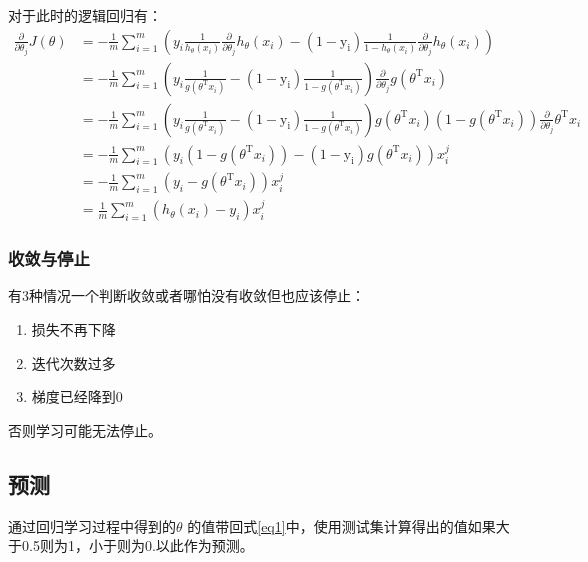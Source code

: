 \documentclass[UTF8,a4paper,AutoFakeBold,AutoFakeSlant]{article}
\begin{document}
对于此时的逻辑回归有：
\begin{equation*}
  \begin{aligned}
    \frac{\partial }{\partial {\theta_j}} J(\theta) & = -\frac{1}{m} \sum_{i = 1}^{m}\left(y_{i} \frac{1}{h_{\theta}\left(x_{i}\right)} \frac{\partial }{\partial {\theta_j}} h_{\theta}\left(x_{i}\right)-\left(1-\mathrm{y}_{\mathrm{i}}\right) \frac{1}{1-h_{\theta}\left(x_{i}\right)} \frac{\partial }{\partial {\theta_j}} h_{\theta}\left(x_{i}\right)\right) \\ 
    & = -\frac{1}{m} \sum_{i  = 1}^{m}\left(y_{i} \frac{1}{g\left(\theta^{\mathrm{T}} x_{i}\right)}-\left(1-\mathrm{y}_{\mathrm{i}}\right) \frac{1}{1-g\left(\theta^{\mathrm{T}} x_{i}\right)}\right) \frac{\partial }{\partial {\theta_j}} g\left(\theta^{\mathrm{T}} x_{i}\right)\\
    &=-\frac{1}{m} \sum_{i=1}^{m}\left(y_{i} \frac{1}{g\left(\theta^{\mathrm{T}} x_{i}\right)}-\left(1-\mathrm{y}_{\mathrm{i}}\right) \frac{1}{1-g\left(\theta^{\mathrm{T}} x_{i}\right)}\right) g\left(\theta^{\mathrm{T}} x_{i}\right)\left(1-g\left(\theta^{\mathrm{T}} x_{i}\right)\right) \frac{\partial }{\partial {\theta_j}} \theta^{\mathrm{T}} x_{i} \\
    &=-\frac{1}{m} \sum_{i=1}^{m}\left(y_{i}\left(1-g\left(\theta^{\mathrm{T}} x_{i}\right)\right)-\left(1-\mathrm{y}_{\mathrm{i}}\right) g\left(\theta^{\mathrm{T}} x_{i}\right)\right) x_{i}^{j} \\
    &=-\frac{1}{m} \sum_{i=1}^{m}\left(y_{i}-g\left(\theta^{\mathrm{T}} x_{i}\right)\right) x_{i}^{j} \\
    &=\frac{1}{m} \sum_{i=1}^{m}\left(h_{\theta}\left(x_{i}\right)-y_{i}\right) x_{i}^{j}
    \end{aligned}
\end{equation*}

\subsubsection{收敛与停止}
有3种情况一个判断收敛或者哪怕没有收敛但也应该停止：
\begin{enumerate}
  \item 损失不再下降
  \item 迭代次数过多
  \item 梯度已经降到0
\end{enumerate}
否则学习可能无法停止。


\subsection{预测}
通过回归学习过程中得到的$\theta$ 的值带回式\ref{eq1}中，使用测试集计算得出的值如果大于0.5则为1，小于则为0.以此作为预测。
\end{document}
